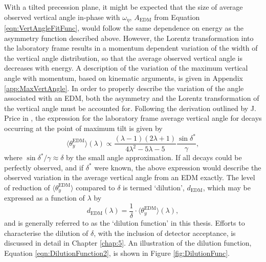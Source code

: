 With a tilted precession plane, it might be expected that the size of average observed vertical angle in-phase with $\omega_{\eta}$, $A_{\text{EDM}}$ from Equation \ref{eqn:VertAngleFitFunc}, would follow the same dependence on energy as the asymmetry function described above. However, the Lorentz transformation into the laboratory frame results in a momentum dependent variation of the width of the vertical angle distribution, so that the average observed vertical angle is decreases with energy. A description of the variation of the maximum vertical angle with momentum, based on kinematic arguments, is given in Appendix \ref{app:MaxVertAngle}. In order to properly describe the variation of the angle associated with an EDM, both the asymmetry and the Lorentz transformation of the vertical angle must be accounted for. Following the derivation outlined by J. Price in \cite{JoeEDMNote}, the expression for the laboratory frame average vertical angle for decays occurring at the point of maximum tilt is given by 
%
%
\begin{equation}
  \langle {\theta_{y}^{\text{EDM}}} \rangle (\lambda) \propto \frac{(\lambda-1)(2\lambda+1)}{4\lambda^{2}-5\lambda-5} \frac{\sin{\delta^{*}}}{\gamma},
  \label{eqn:DilutionFunction1}
\end{equation} 
%
where $\sin{\delta^{*}}/\gamma \approx \delta$ by the small angle approximation. If all decays could be perfectly observed, and if $\delta^{*}$ were known, the above expression would describe the observed variation in the average vertical angle from an EDM exactly. The level of reduction of $\langle {\theta_{y}^{\text{EDM}}} \rangle $ compared to $\delta$ is termed `dilution', $d_{\text{EDM}}$, which may be expressed as a function of $\lambda$ by 
%
\begin{equation}
  d_{\text{EDM}}(\lambda) = \frac{1}{\delta} \cdot \langle {\theta_{y}^{\text{EDM}}} \rangle(\lambda),
  \label{eqn:DilutionFunction2}
\end{equation} %
%
and is generally referred to as the `dilution function' in this thesis. Efforts to characterise the dilution of $\delta$, with the inclusion of detector acceptance, is discussed in detail in Chapter \ref{chap:5}. An illustration of the dilution function, Equation \ref{eqn:DilutionFunction2}, is shown in Figure \ref{fig:DilutionFunc}.

